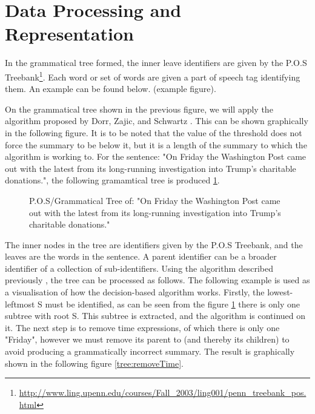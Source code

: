 \section{Data Processing and Representation}
\par In the grammatical tree formed, the inner leave identifiers are given by the P.O.S Treebank\footnote{\url{http://www.ling.upenn.edu/courses/Fall_2003/ling001/penn_treebank_pos.html}}. Each word or set of words are given a part of speech tag identifying them. An example can be found below. (example figure).
\par On the grammatical tree shown in the previous figure, we will apply the algorithm proposed by Dorr, Zajic, and Schwartz \cite{dorrzajicschwartz2003}. This can be shown graphically in the following figure. It is to be noted that the value of the threshold does not force the summary to be below it, but it is a length of the summary to which the algorithm is working to. For the sentence: "On Friday the Washington Post came out with the latest from its long-running investigation into Trump's charitable donations.", the following gramamtical tree is produced \ref{tree:origString}.
\begin{figure}[h]
\caption{P.O.S/Grammatical Tree of: "On Friday the Washington Post came out with the latest from its long-running investigation into Trump's charitable donations."}
\label{tree:origString}
\end{figure}
\par The inner nodes in the tree are identifiers given by the P.O.S Treebank, and the leaves are the words in the sentence. A parent identifier can be a broader identifier of a collection of sub-identifiers. Using the algorithm described previously \cite{dorrzajicschwartz2003}, the tree can be processed as follows. The following example is used as a visualisation of how the decision-based algorithm works. Firstly, the lowest-leftmost S must be identified, as can be seen from the figure \ref{tree:origString} there is only one subtree with root S. This subtree is  extracted, and the algorithm is continued on it. The next step is to remove time expressions, of which there is only one "Friday", however we must remove its parent to (and thereby its children) to avoid producing a grammatically incorrect summary. The result is graphically shown in the following figure \ref{tree:removeTime}.
